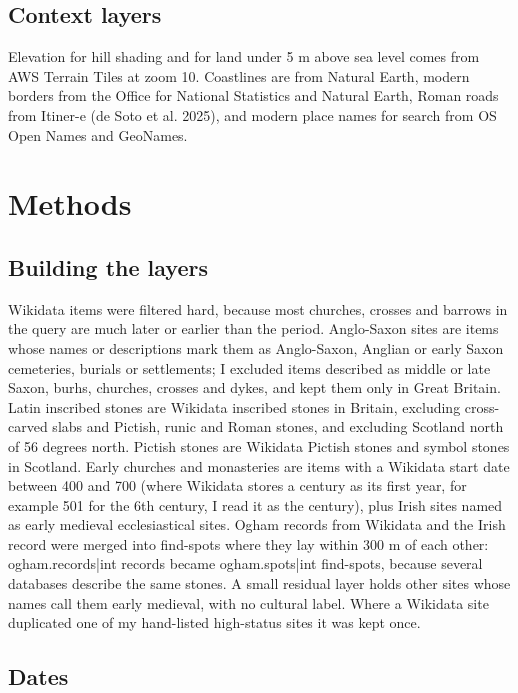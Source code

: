 \documentclass[11pt,a4paper]{article}
\begin{document}
\subsection{Context layers}

Elevation for hill shading and for land under 5 m above sea level comes from AWS Terrain Tiles at zoom 10. Coastlines are from Natural Earth, modern borders from the Office for National Statistics and Natural Earth, Roman roads from Itiner-e (de Soto et al. 2025), and modern place names for search from OS Open Names and GeoNames.

\section{Methods}

\subsection{Building the layers}

Wikidata items were filtered hard, because most churches, crosses and barrows in the query are much later or earlier than the period. Anglo-Saxon sites are items whose names or descriptions mark them as Anglo-Saxon, Anglian or early Saxon cemeteries, burials or settlements; I excluded items described as middle or late Saxon, burhs, churches, crosses and dykes, and kept them only in Great Britain. Latin inscribed stones are Wikidata inscribed stones in Britain, excluding cross-carved slabs and Pictish, runic and Roman stones, and excluding Scotland north of 56 degrees north. Pictish stones are Wikidata Pictish stones and symbol stones in Scotland. Early churches and monasteries are items with a Wikidata start date between 400 and 700 (where Wikidata stores a century as its first year, for example 501 for the 6th century, I read it as the century), plus Irish sites named as early medieval ecclesiastical sites. Ogham records from Wikidata and the Irish record were merged into find-spots where they lay within 300 m of each other: {{ogham.records|int}} records became {{ogham.spots|int}} find-spots, because several databases describe the same stones. A small residual layer holds other sites whose names call them early medieval, with no cultural label. Where a Wikidata site duplicated one of my hand-listed high-status sites it was kept once.

\subsection{Dates}
\end{document}
